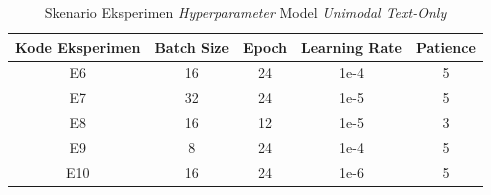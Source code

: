 \begin{table}[H]
    \centering
    \caption{Skenario Eksperimen \textit{Hyperparameter} Model \textit{Unimodal Text-Only}}
    \label{tabel:skenario_hyperparameter_unimodal_text_only}
    \small
    \setlength{\tabcolsep}{8pt}
    \renewcommand{\arraystretch}{1.1}
    \begin{tabular}{c c c c c}
        \hline
        \textbf{Kode Eksperimen} & \textbf{Batch Size} & \textbf{Epoch} & \textbf{Learning Rate} & \textbf{Patience} \\
        \hline
        E6 & 16 & 24 & 1e-4 & 5 \\
        E7 & 32 & 24 & 1e-5 & 5 \\
        E8 & 16 & 12 & 1e-5 & 3 \\
        E9 & 8 & 24 & 1e-4 & 5 \\
        E10 & 16 & 24 & 1e-6 & 5 \\
        \hline
    \end{tabular}
\end{table}





